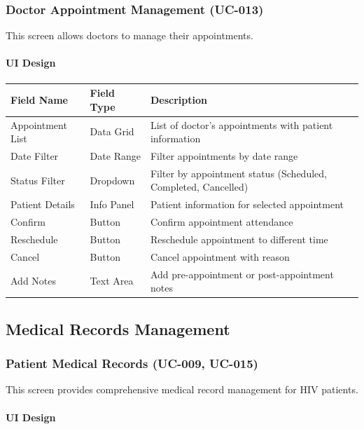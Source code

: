 \documentclass[12pt,a4paper]{article}
\begin{document}
\subsubsection{Doctor Appointment Management (UC-013)}

This screen allows doctors to manage their appointments.

\paragraph{UI Design}

\begin{longtable}{|p{3cm}|p{3cm}|p{8cm}|}
\hline
\textbf{Field Name} & \textbf{Field Type} & \textbf{Description} \\
\hline
Appointment List & Data Grid & List of doctor's appointments with patient information \\
\hline
Date Filter & Date Range & Filter appointments by date range \\
\hline
Status Filter & Dropdown & Filter by appointment status (Scheduled, Completed, Cancelled) \\
\hline
Patient Details & Info Panel & Patient information for selected appointment \\
\hline
Confirm & Button & Confirm appointment attendance \\
\hline
Reschedule & Button & Reschedule appointment to different time \\
\hline
Cancel & Button & Cancel appointment with reason \\
\hline
Add Notes & Text Area & Add pre-appointment or post-appointment notes \\
\hline
\end{longtable}

\subsection{Medical Records Management}

\subsubsection{Patient Medical Records (UC-009, UC-015)}

This screen provides comprehensive medical record management for HIV patients.

\paragraph{UI Design}
\end{document}
